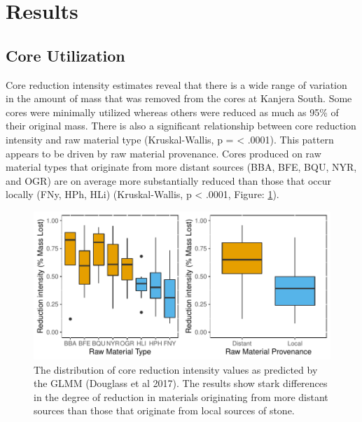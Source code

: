 \documentclass[]{elsarticle} %
\makeatletter
\def\maxwidth{\ifdim\Gin@nat@width>\linewidth\linewidth
\else\Gin@nat@width\fi}
\let\Oldincludegraphics\includegraphics
\renewcommand{\includegraphics}[1]{\Oldincludegraphics[width=\maxwidth]{#1}}
\makeatother
\begin{document}
\hypertarget{results}{%
\section{Results}\label{results}}

\hypertarget{core-utilization}{%
\subsection{Core Utilization}\label{core-utilization}}

Core reduction intensity estimates reveal that there is a wide range of
variation in the amount of mass that was removed from the cores at
Kanjera South. Some cores were minimally utilized whereas others were
reduced as much as 95\% of their original mass. There is also a
significant relationship between core reduction intensity and raw
material type (Kruskal-Wallis, p = \textless{} .0001). This pattern
appears to be driven by raw material provenance. Cores produced on raw
material types that originate from more distant sources (BBA, BFE, BQU,
NYR, and OGR) are on average more substantially reduced than those that
occur locally (FNy, HPh, HLi) (Kruskal-Wallis, p \textless{} .0001,
Figure: \ref{core_redux_rm}).

\begin{figure}
\centering
\includegraphics{Reeves_Braun_et_al_2020_Kanjera_South_JHE_files/figure-latex/Figure:core reduction intentisity-1.pdf}
\caption{The distribution of core reduction intensity values as
predicted by the GLMM (Douglass et al 2017). The results show stark
differences in the degree of reduction in materials originating from
more distant sources than those that originate from local sources of
stone. \label{core_redux_rm}}
\end{figure}
\end{document}
